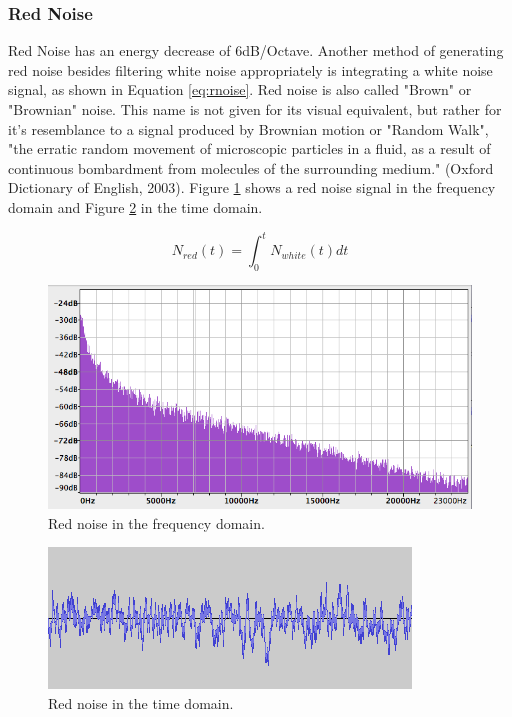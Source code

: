\documentclass[12pt,twoside]{report}
\begin{document}
\subsubsection{Red Noise}

Red Noise has an energy decrease of 6dB/Octave. Another method of generating red noise besides filtering white noise appropriately is integrating a white noise signal, as shown in Equation \ref{eq:rnoise}. Red noise is also called "Brown" or "Brownian" noise. This name is not given for its visual equivalent, but rather for it's resemblance to a signal produced by Brownian motion or "Random Walk", "the erratic random movement of microscopic particles in a fluid, as a result of continuous bombardment from molecules of the surrounding medium." (Oxford Dictionary of English, 2003). Figure \ref{fig:rnoisef} shows a red noise signal in the frequency domain and Figure \ref{fig:rnoiset} in the time domain.

\begin{equation}
  N_{red}(t) = \int_{0}^{t} N_{white}(t)dt
  \label{eq:rnoise}
\end{equation}

\begin{figure}[t!]
  \includegraphics[scale=0.6]{img/rnoisef}
  \caption{Red noise in the frequency domain.}
  \label{fig:rnoisef}
\end{figure}

\begin{figure}[t!]
  \includegraphics[scale=0.7]{img/rnoiset}
  \caption{Red noise in the time domain.}
  \label{fig:rnoiset}
\end{figure}
\end{document}
